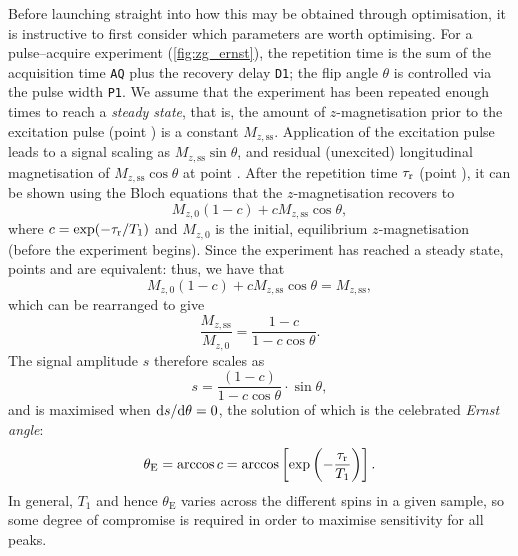 Before launching straight into how this may be obtained through optimisation, it is instructive to first consider which parameters are worth optimising.
For a pulse--acquire experiment (\cref{fig:zg_ernst}), the repetition time is the sum of the acquisition time \texttt{AQ} plus the recovery delay \texttt{D1}; the flip angle $\theta$ is controlled via the pulse width \texttt{P1}.
We assume that the experiment has been repeated enough times to reach a \textit{steady state}, that is, the amount of $z$-magnetisation prior to the excitation pulse (point ) is a constant $M_{z,\text{ss}}$.
Application of the excitation pulse leads to a signal scaling as $M_{z,\text{ss}}\sin\theta$, and residual (unexcited) longitudinal magnetisation of $M_{z,\text{ss}}\cos\theta$ at point .
After the repetition time $\tau_\mathrm{r}$ (point ), it can be shown using the Bloch equations\autocite{Bloch1946PR} that the $z$-magnetisation recovers to
\begin{equation}
    \label{eq:z_magn_ernst1}
    M_{z,0}(1 - c) + cM_{z,\text{ss}}\cos\theta,
\end{equation}
where $c = \exp(-\tau_\mathrm{r}/T_1)$ and $M_{z,0}$ is the initial, equilibrium $z$-magnetisation (before the experiment begins).
Since the experiment has reached a steady state, points  and  are equivalent: thus, we have that
\begin{equation}
    \label{eq:z_magn_ernst2}
    M_{z,0}(1 - c) + cM_{z,\text{ss}}\cos\theta = M_{z,\text{ss}},
\end{equation}
which can be rearranged to give
\begin{equation}
    \label{eq:z_magn_ernst3}
    \frac{M_{z,\text{ss}}}{M_{z,0}} = \frac{1 - c}{1 - c\cos\theta}.
\end{equation}
The signal amplitude $s$ therefore scales as
\begin{equation}
    \label{eq:z_magn_ernst4}
    s = \frac{(1 - c)}{1 - c\cos\theta} \cdot \sin\theta,
\end{equation}
and is maximised when $\mathrm{d} s/\mathrm{d} \theta = 0$, the solution of which is the celebrated \textit{Ernst angle}\autocite{Ernst1966RSI}:
\begin{equation}
    \label{eq:ernst_angle}
    \theta_\text{E} = \arccos{c} = \arccos\left[\exp\left(-\frac{\tau_\mathrm{r}}{T_1}\right)\right].
\end{equation}
In general, $T_1$ and hence $\theta_\text{E}$ varies across the different spins in a given sample, so some degree of compromise is required in order to maximise sensitivity for all peaks.

